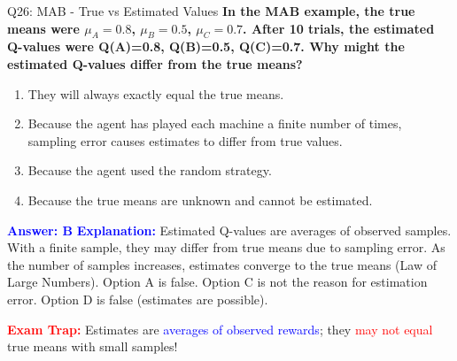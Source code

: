 \documentclass[8pt]{beamer}
\begin{document}
	\begin{frame}{Q26: MAB - True vs Estimated Values}
		\fontsize{6.5}{7.5}\selectfont
		\textbf{In the MAB example, the true means were $\mu_A = 0.8$, $\mu_B = 0.5$, $\mu_C = 0.7$. After 10 trials, the estimated Q-values were Q(A)=0.8, Q(B)=0.5, Q(C)=0.7. Why might the estimated Q-values differ from the true means?}
		
		\begin{enumerate}
			\item They will always exactly equal the true means.
			\item Because the agent has played each machine a finite number of times, sampling error causes estimates to differ from true values.
			\item Because the agent used the random strategy.
			\item Because the true means are unknown and cannot be estimated.
		\end{enumerate}
		
		\vspace{0.1cm}
		\textcolor{blue}{\textbf{Answer: B}}
		\vspace{0.1cm}
		\textcolor{blue}{\textbf{Explanation:}} Estimated Q-values are averages of observed samples. With a finite sample, they may differ from true means due to sampling error. As the number of samples increases, estimates converge to the true means (Law of Large Numbers). Option A is false. Option C is not the reason for estimation error. Option D is false (estimates are possible).
		
		\textcolor{red}{\textbf{Exam Trap:}} Estimates are \textcolor{blue}{averages of observed rewards}; they \textcolor{red}{may not equal} true means with small samples!
	\end{frame}
	
\end{document}
